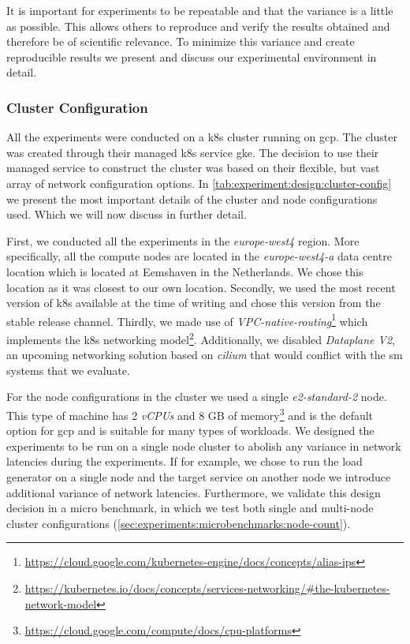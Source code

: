 It is important for experiments to be repeatable and that the variance is a little as possible. This allows others to reproduce and verify the results obtained and therefore be of scientific relevance. To minimize this variance and create reproducible results we present and discuss our experimental environment in detail.

\subsubsection{Cluster Configuration}
\label{sec:experiments:design:environment:cluster}

All the experiments were conducted on a \gls{k8s} cluster running on \gls{gcp}. The cluster was created through their managed \gls{k8s} service \gls{gke}. The decision to use their managed service to construct the cluster was based on their flexible, but vast array of network configuration options. In \cref{tab:experiment:design:cluster-config} we present the most important details of the cluster and node configurations used. Which we will now discuss in further detail.



First, we conducted all the experiments in the \textit{europe-west4} region. More specifically, all the compute nodes are located in the \textit{europe-west4-a} data centre location which is located at Eemshaven in the Netherlands. We chose this location as it was closest to our own location. Secondly, we used the most recent version of \gls{k8s} available at the time of writing and chose this version from the stable release channel. Thirdly, we made use of \textit{VPC-native-routing}\footnote{\url{https://cloud.google.com/kubernetes-engine/docs/concepts/alias-ips}} which implements the \gls{k8s} networking model\footnote{\url{https://kubernetes.io/docs/concepts/services-networking/\#the-kubernetes-network-model}}. Additionally, we disabled \textit{Dataplane V2}, an upcoming networking solution based on \textit{cilium} that would conflict with the \gls{sm} systems that we evaluate.

For the node configurations in the cluster we used a single \textit{e2-standard-2} node. This type of machine has 2 \textit{vCPUs} and 8 GB of memory\footnote{\url{https://cloud.google.com/compute/docs/cpu-platforms}} and is the default option for \gls{gcp} and is suitable for many types of workloads. We designed the experiments to be run on a single node cluster to abolish any variance in network latencies during the experiments. If for example, we chose to run the load generator on a single node and the target service on another node we introduce additional variance of network latencies. Furthermore, we validate this design decision in a micro benchmark, in which we test both single and multi-node cluster configurations (\cref{sec:experiments:microbenchmarks:node-count}). 

